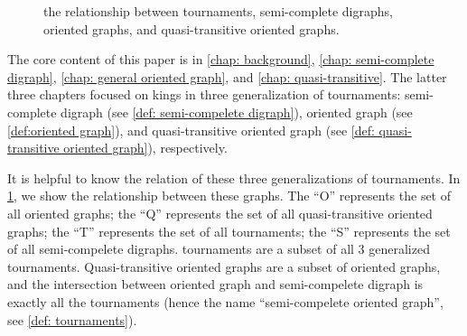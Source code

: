 \begin{figure}
  \centering
  \caption{the relationship between tournaments,
    semi-complete digraphs, oriented graphs,
    and quasi-transitive oriented graphs.}
  \label{fig: generalized tournaments relationship}  %
\end{figure}

The core content of this paper is in
\cref{chap: background}, \cref{chap: semi-complete digraph},
\cref{chap: general oriented graph},
and \cref{chap: quasi-transitive}.
The latter three chapters focused on kings in
three generalization of tournaments:
semi-complete digraph (see \cref{def: semi-compelete digraph}),
oriented graph (see \cref{def:oriented graph}),
and quasi-transitive oriented graph
(see \cref{def: quasi-transitive oriented graph}),
respectively.

It is helpful to know the relation of these
three generalizations of tournaments.
In \cref{fig: generalized tournaments relationship},
we show the relationship between these graphs.
The ``O'' represents the set of all oriented graphs;
the ``Q'' represents the set of all quasi-transitive oriented graphs;
the ``T'' represents the set of all tournaments;
the ``S'' represents the set of all semi-compelete digraphs.
tournaments are a subset of all 3 generalized tournaments.
Quasi-transitive oriented graphs are a subset of oriented graphs,
and the intersection between oriented graph and
semi-compelete digraph is exactly all the tournaments
(hence the name ``semi-compelete oriented graph'',
see \cref{def: tournaments}).


